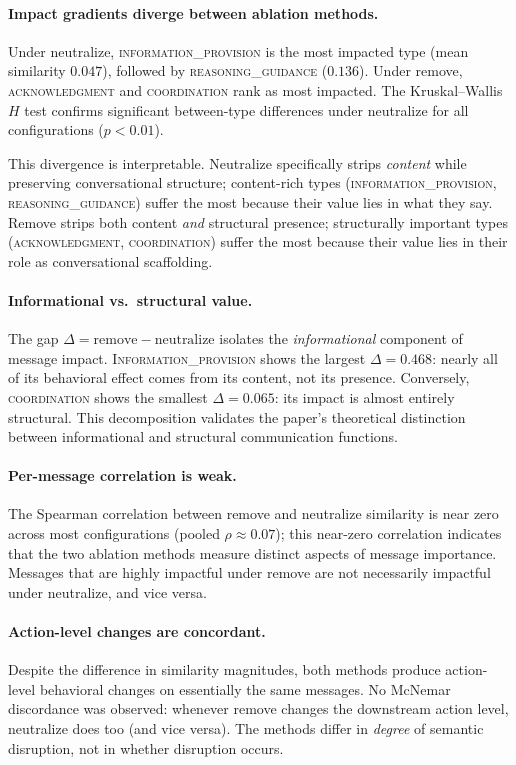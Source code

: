\paragraph{Impact gradients diverge between ablation methods.}
Under neutralize, \textsc{information\_provision} is the most impacted type (mean similarity $0.047$), followed by \textsc{reasoning\_guidance} ($0.136$).  Under remove, \textsc{acknowledgment} and \textsc{coordination} rank as most impacted.  The Kruskal--Wallis $H$ test confirms significant between-type differences under neutralize for all configurations ($p < 0.01$).

This divergence is interpretable.  Neutralize specifically strips \emph{content} while preserving conversational structure; content-rich types (\textsc{information\_provision}, \textsc{reasoning\_guidance}) suffer the most because their value lies in what they say.  Remove strips both content \emph{and} structural presence; structurally important types (\textsc{acknowledgment}, \textsc{coordination}) suffer the most because their value lies in their role as conversational scaffolding.

\paragraph{Informational vs.\ structural value.}
The gap $\Delta = \text{remove} - \text{neutralize}$ isolates the \emph{informational} component of message impact.  \textsc{Information\_provision} shows the largest $\Delta = 0.468$: nearly all of its behavioral effect comes from its content, not its presence.  Conversely, \textsc{coordination} shows the smallest $\Delta = 0.065$: its impact is almost entirely structural.  This decomposition validates the paper's theoretical distinction between informational and structural communication functions.

\paragraph{Per-message correlation is weak.}
The Spearman correlation between remove and neutralize similarity is near zero across most configurations (pooled $\rho \approx 0.07$); this near-zero correlation indicates that the two ablation methods measure distinct aspects of message importance.  Messages that are highly impactful under remove are not necessarily impactful under neutralize, and vice versa.

\paragraph{Action-level changes are concordant.}
Despite the difference in similarity magnitudes, both methods produce action-level behavioral changes on essentially the same messages.  No McNemar discordance was observed: whenever remove changes the downstream action level, neutralize does too (and vice versa).  The methods differ in \emph{degree} of semantic disruption, not in whether disruption occurs.


